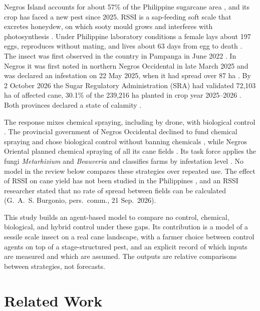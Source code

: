 \documentclass[conference]{IEEEtran}
\begin{document}
Negros Island accounts for about 57\% of the Philippine sugarcane area \cite{PCAARRDnd}, and its crop has faced a new pest since 2025. RSSI is a sap-feeding soft scale that excretes honeydew, on which sooty mould grows and interferes with photosynthesis \cite{Guerrero2026}. Under Philippine laboratory conditions a female lays about 197 eggs, reproduces without mating, and lives about 63 days from egg to death \cite{Guerrero2026}. The insect was first observed in the country in Pampanga in June 2022 \cite{Navasero2023}. In Negros it was first noted in northern Negros Occidental in late March 2025 and was declared an infestation on 22 May 2025, when it had spread over 87 ha \cite{ManilaBulletin2025}. By 2 October 2026 the Sugar Regulatory Administration (SRA) had validated 72,103 ha of affected cane, 30.1\% of the 239,216 ha planted in crop year 2025--2026 \cite{SRA2026FOI}. Both provinces declared a state of calamity \cite{Masculino2025,Bayoran2026,Partlow2026}.

The response mixes chemical spraying, including by drone, with biological control \cite{ChiniMandi2026}. The provincial government of Negros Occidental declined to fund chemical spraying and chose biological control without banning chemicals \cite{Bayoran2026}, while Negros Oriental planned chemical spraying of all its cane fields \cite{Partlow2026}. Its task force applies the fungi \emph{Metarhizium} and \emph{Beauveria} and classifies farms by infestation level \cite{PGNO2026}. No model in the review below compares these strategies over repeated use. The effect of RSSI on cane yield has not been studied in the Philippines \cite{Guerrero2024}, and an RSSI researcher stated that no rate of spread between fields can be calculated (G.~A.~S. Burgonio, pers.\ comm., 21 Sep.\ 2026).

This study builds an agent-based model to compare no control, chemical, biological, and hybrid control under these gaps. Its contribution is a model of a sessile scale insect on a real cane landscape, with a farmer choice between control agents on top of a stage-structured pest, and an explicit record of which inputs are measured and which are assumed. The outputs are relative comparisons between strategies, not forecasts.

\section{Related Work}
\end{document}
